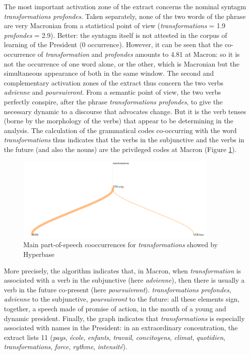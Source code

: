 The most important activation zone of the extract concerns the nominal syntagm \textit{transformations profondes}. Taken separately, none of the two words of the phrase are very Macronian from a statistical point of view (\textit{transformations} = 1.9 \textit{profondes} = 2.9). Better: the syntagm itself is not attested in the corpus of learning of the President (0 occurrence). However, it can be seen that the co-occurrence of \textit{transformation} and \textit{profondes} amounts to 4.81 at Macron: so it is not the occurrence of one word alone, or the other, which is Macronian but the simultaneous appearance of both in the same window. The second and complementary activation zones of the extract thus concern the two verbs \textit{advienne} and \textit{poursuivront}. From a semantic point of view, the two verbs perfectly conspire, after the phrase \textit{transformations profondes}, to give the necessary dynamic to a discourse that advocates change. But it is the verb tenses (borne by the morphology of the verbs) that appear to be determining in the analysis. The calculation of the grammatical codes co-occurring with the word \textit{transformations} thus indicates that the verbs in the subjunctive and the verbs in the future (and also the nouns) are the privileged codes at Macron (Figure \ref{macron}). 

\begin{figure}[h]
\begin{center}
\includegraphics[width=10cm]{img/macron_cooc.png}
\caption{Main part-of-speech cooccurrences for \textit{transformations} showed by Hyperbase}
\label{macron}
\end{center}
\end{figure}


More precisely, the algorithm indicates that, in Macron, when \textit{transformation} is associated with a verb in the subjunctive (here \textit{advienne}), then there is usually a verb in the future co-present (here \textit{poursuivront}). \textit{transformations profondes}, \textit{advienne} to the subjunctive, \textit{poursuivront} to the future: all these elements sign, together, a speech made of promise of action, in the mouth of a young and dynamic president. Finally, the graph indicates that \textit{transformations} is especially associated with names in the President: in an extraordinary concentration, the extract lists 11 (\textit{pays}, \textit{école}, \textit{enfants}, \textit{travail}, \textit{concitoyens}, \textit{climat}, \textit{quotidien}, \textit{transformations}, \textit{force}, \textit{rythme}, \textit{intensité}).

